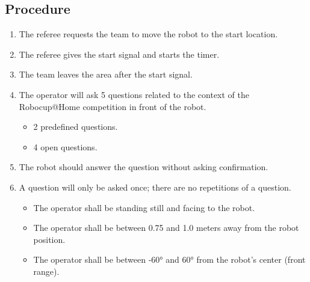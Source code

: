 \subsection*{Procedure}
	\begin{enumerate}[nosep]
		\item The referee requests the team to move the robot to the start location.
		\item The referee gives the start signal and starts the timer.
		\item The team leaves the area after the start signal.		
		
		\item The operator will ask 5 questions related to the context of the Robocup@Home competition in front of the robot.
		\begin{itemize}
		    \item 2 predefined questions.
		    \item 4 open questions.
		\end{itemize}
		\item The robot should answer the question without asking confirmation.
		\item A question will only be asked once; there are no repetitions of a question.
		\begin{itemize}
		    \item The operator shall be standing still and facing to the robot.
		    \item The operator shall be between 0.75 and 1.0 meters away from the robot position.
    		\item The operator shall be between -60° and 60° from the robot’s center (front range).
		\end{itemize}
	\end{enumerate}


